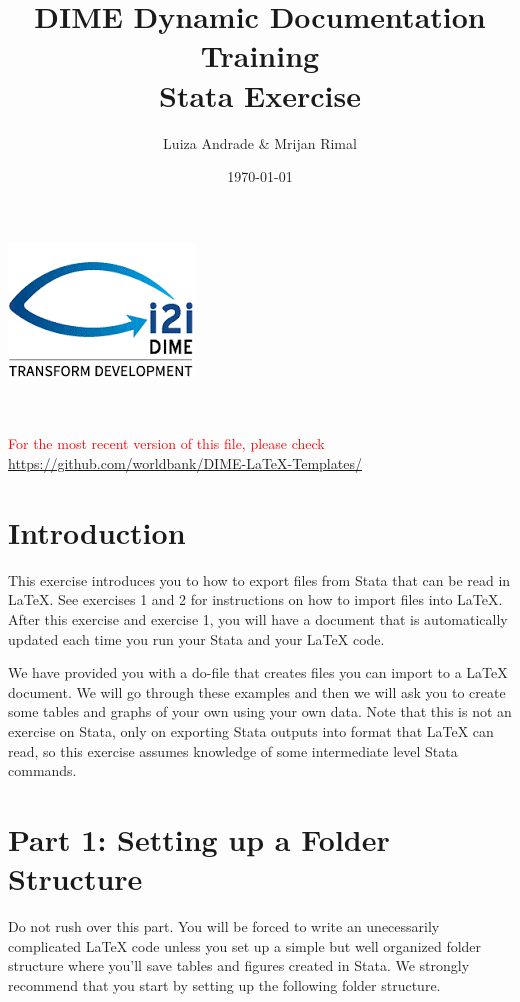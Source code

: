 \documentclass[]{article}
\title{DIME Dynamic Documentation Training \\ Stata Exercise}
\author{Luiza Andrade \& Mrijan Rimal}
\date{\today}
\begin{document}
\makeatletter
\begin{titlepage}
	\begin{center}
		\includegraphics[width=0.3\linewidth]{img/i2i.png}\\[10ex]
		{\LARGE \bfseries  \@title }\\[2ex] 
		{\Large  \@author}\\[20ex] 
		{\large \@date}
	\end{center}
	\vspace{5cm}
	\textcolor{red}{For the most recent version of this file, please check \url{https://github.com/worldbank/DIME-LaTeX-Templates/}}
\end{titlepage}
\makeatother

\section*{Introduction}
This exercise introduces you to how to export files from Stata that can be read in {\LaTeX}. See exercises 1 and 2 for instructions on how to import files into {\LaTeX}. After this exercise and exercise 1, you will have a document that is automatically updated each time you run your Stata and your {\LaTeX} code.

We have provided you with a do-file that creates files you can import to a {\LaTeX} document. We will go through these examples and then we will ask you to create some tables and graphs of your own using your own data. Note that this is not an exercise on Stata, only on exporting Stata outputs into format that {\LaTeX} can read, so this exercise assumes knowledge of some intermediate level Stata commands.

\section*{Part 1: Setting up a Folder Structure}
Do not rush over this part. You will be forced to write an unecessarily complicated {\LaTeX} code unless you set up a simple but well organized folder structure where you'll save tables and figures created in Stata. We strongly recommend that you start by setting up the following folder structure. 
\end{document}
